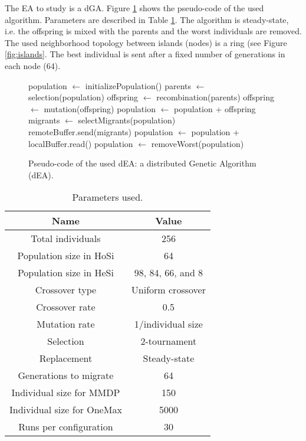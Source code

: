 The EA to study is a dGA. Figure \ref{fig:EA} shows the pseudo-code of the used algorithm. Parameters are described in Table \ref{table:parameters}. The algorithm is steady-state, i.e. the offspring is mixed with the parents and the worst individuals are removed. The used neighborhood topology between islands (nodes) is a ring (see Figure \ref{fig:islands}. The best individual is sent after a fixed number of generations in each node (64). %



\begin{figure}

\begin{algorithmic}
\STATE population $\gets$ initializePopulation()
    \STATE parents $\gets$ selection(population)
    \STATE offspring $\gets$ recombination(parents)
    \STATE offspring $\gets$ mutation(offspring)
    \STATE population $\gets$ population + offspring
      \STATE migrants $\gets$ selectMigrants(population)
      \STATE remoteBuffer.send(migrants)
    \ENDIF
      \STATE population $\gets$ population + localBuffer.read()
    \ENDIF
    \STATE population $\gets$ removeWorst(population)
\ENDWHILE

\end{algorithmic}
\caption{Pseudo-code of the used dEA: a distributed Genetic Algorithm (dEA).}
\label{fig:EA}
\end{figure}


\begin{table}
\centering
\caption{Parameters used.}
\begin{tabular}{|c|c|} \hline
Name & Value\\ \hline
Total individuals & 256\\ \hline
Population size in HoSi & 64 \\ \hline
Population size in HeSi & 98, 84, 66, and 8\\ \hline
Crossover type & Uniform crossover \\ \hline
Crossover rate & 0.5\\ \hline
Mutation rate & 1/individual size\\ \hline
Selection & 2-tournament \\ \hline
Replacement & Steady-state\\ \hline
Generations to migrate & 64 \\ \hline
Individual size for MMDP & 150 \\ \hline
Individual size for OneMax & 5000 \\
Runs per configuration & 30 \\ 

\hline\end{tabular}
\label{table:parameters}
\end{table}

